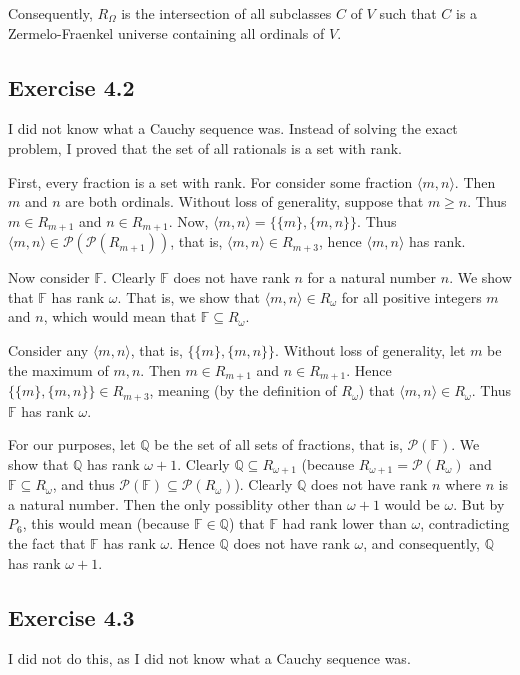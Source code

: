 \documentclass{article}
\theoremstyle{definition}
\begin{document}
Consequently, $R_\Omega$ is the intersection of all subclasses $C$ of $V$ such that $C$ is a Zermelo-Fraenkel universe containing all ordinals of $V$.

\subsection*{Exercise 4.2}
I did not know what a Cauchy sequence was. Instead of solving the exact problem, I proved that the set of all rationals is a set with rank.

First, every fraction is a set with rank. For consider some fraction $\langle m,n\rangle$. Then $m$ and $n$ are both ordinals. Without loss of generality, suppose that 
$m\ge n$. Thus $m\in R_{m+1}$ and $n\in R_{m+1}$. Now, $\langle m,n\rangle=\{\{m\},\{m,n\}\}$. Thus 
$\langle m,n\rangle\in\mathcal{P}(\mathcal{P}(R_{m+1}))$, that is, $\langle m,n\rangle\in R_{m+3}$, hence $\langle m,n\rangle$ has rank.

Now consider $\mathbb{F}$. Clearly $\mathbb{F}$ does not have rank $n$ for a natural number $n$. We show that $\mathbb{F}$ has rank 
$\omega$. That is, we show that $\langle m,n\rangle\in R_\omega$ for all positive integers $m$ and $n$, which would mean that 
$\mathbb{F}\subseteq R_\omega$. 

Consider any $\langle m,n\rangle$, that is, $\{\{m\},\{m,n\}\}$. Without loss of generality, let $m$ be the maximum of $m,n$. 
Then $m\in R_{m+1}$ and $n\in R_{m+1}$. Hence $\{\{m\},\{m,n\}\}\in R_{m+3}$, meaning (by the definition of $R_\omega$) that 
$\langle m,n\rangle\in R_\omega$. Thus $\mathbb{F}$ has rank $\omega$.

For our purposes, let $\mathbb{Q}$ be the set of all sets of fractions, that is, $\mathcal{P}(\mathbb{F})$. We show that 
$\mathbb{Q}$ has rank $\omega+1$. Clearly $\mathbb{Q}\subseteq R_{\omega+1}$ (because 
$R_{\omega+1}=\mathcal{P}(R_\omega)$ and $\mathbb{F}\subseteq R_\omega$, and thus 
$\mathcal{P}(\mathbb{F})\subseteq \mathcal{P}(R_\omega)$). Clearly $\mathbb{Q}$ does not have rank $n$ where $n$ is a natural number. 
Then the only possiblity other than $\omega+1$ would be $\omega$. But by $P_6$, this would mean 
(because $\mathbb{F}\in\mathbb{Q}$) that $\mathbb{F}$ had rank lower than $\omega$, contradicting the fact that $\mathbb{F}$ has rank 
$\omega$. Hence $\mathbb{Q}$ does not have rank $\omega$, and consequently, $\mathbb{Q}$ has rank $\omega+1$.

\subsection*{Exercise 4.3}
I did not do this, as I did not know what a Cauchy sequence was.
\end{document}
